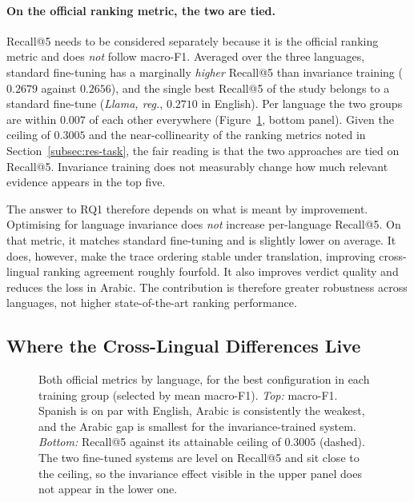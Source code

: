 \paragraph{On the official ranking metric, the two are tied.}
Recall@5 needs to be considered separately because it is the official ranking metric and does
\emph{not} follow macro-F1. Averaged over the three languages, standard fine-tuning has a
marginally \emph{higher} Recall@5 than invariance training ($0.2679$ against $0.2656$), and the single
best Recall@5 of the study belongs to a standard fine-tune (\emph{Llama, reg.}, $0.2710$ in English).
Per language the two groups are within $0.007$ of each other everywhere
(Figure~\ref{fig:results-language}, bottom panel). Given the ceiling of $0.3005$ and the near-collinearity
of the ranking metrics noted in Section~\ref{subsec:res-task}, the fair reading is that the two
approaches are tied on Recall@5. Invariance training does not measurably change how much relevant
evidence appears in the top five.

The answer to RQ1 therefore depends on what is meant by improvement. Optimising for language
invariance does \emph{not} increase per-language Recall@5. On that metric, it matches standard
fine-tuning and is slightly lower on average. It does, however, make the trace ordering stable under
translation, improving cross-lingual ranking agreement roughly fourfold. It also improves verdict
quality and reduces the loss in Arabic. The contribution is therefore greater robustness across
languages, not higher state-of-the-art ranking performance.

\subsection{Where the Cross-Lingual Differences Live}
\label{subsec:res-language}

\begin{figure}[htbp]
  \centering
  
  \caption{Both official metrics by language, for the best configuration in each training group
  (selected by mean macro-F1). \emph{Top:} macro-F1. Spanish is on par with English, Arabic is
  consistently the weakest, and the Arabic gap is smallest for the invariance-trained system.
  \emph{Bottom:} Recall@5 against its attainable ceiling of $0.3005$ (dashed). The two fine-tuned
  systems are level on Recall@5 and sit close to the ceiling, so the invariance effect visible in the
  upper panel does not appear in the lower one.}
  \label{fig:results-language}
\end{figure}

